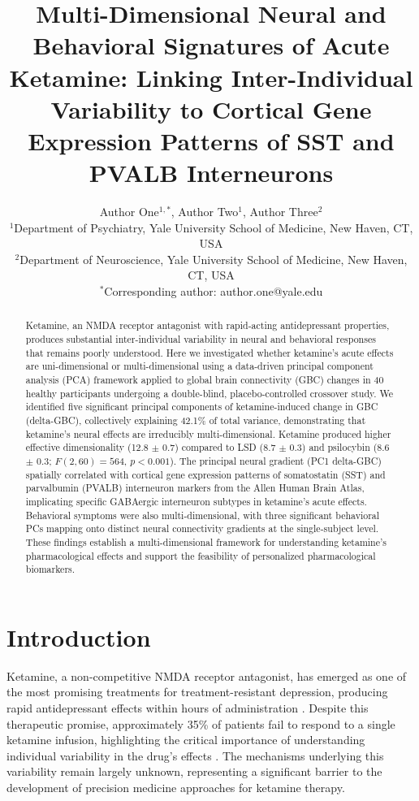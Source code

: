 \documentclass[12pt]{article}
\title{Multi-Dimensional Neural and Behavioral Signatures of Acute Ketamine: Linking Inter-Individual Variability to Cortical Gene Expression Patterns of SST and PVALB Interneurons}
\author{Author One$^{1,*}$, Author Two$^{1}$, Author Three$^{2}$ \\
\small $^1$Department of Psychiatry, Yale University School of Medicine, New Haven, CT, USA \\
\small $^2$Department of Neuroscience, Yale University School of Medicine, New Haven, CT, USA \\
\small $^*$Corresponding author: author.one@yale.edu}
\date{}
\begin{document}
\maketitle

\begin{abstract}
Ketamine, an NMDA receptor antagonist with rapid-acting antidepressant properties, produces substantial inter-individual variability in neural and behavioral responses that remains poorly understood. Here we investigated whether ketamine's acute effects are uni-dimensional or multi-dimensional using a data-driven principal component analysis (PCA) framework applied to global brain connectivity (GBC) changes in 40 healthy participants undergoing a double-blind, placebo-controlled crossover study. We identified five significant principal components of ketamine-induced change in GBC (delta-GBC), collectively explaining 42.1\% of total variance, demonstrating that ketamine's neural effects are irreducibly multi-dimensional. Ketamine produced higher effective dimensionality (12.8 $\pm$ 0.7) compared to LSD (8.7 $\pm$ 0.3) and psilocybin (8.6 $\pm$ 0.3; $F(2,60)=564$, $p<0.001$). The principal neural gradient (PC1 delta-GBC) spatially correlated with cortical gene expression patterns of somatostatin (SST) and parvalbumin (PVALB) interneuron markers from the Allen Human Brain Atlas, implicating specific GABAergic interneuron subtypes in ketamine's acute effects. Behavioral symptoms were also multi-dimensional, with three significant behavioral PCs mapping onto distinct neural connectivity gradients at the single-subject level. These findings establish a multi-dimensional framework for understanding ketamine's pharmacological effects and support the feasibility of personalized pharmacological biomarkers.
\end{abstract}

\section{Introduction}

Ketamine, a non-competitive NMDA receptor antagonist, has emerged as one of the most promising treatments for treatment-resistant depression, producing rapid antidepressant effects within hours of administration \citep{berman2000antidepressant, zarate2006randomized}. Despite this therapeutic promise, approximately 35\% of patients fail to respond to a single ketamine infusion, highlighting the critical importance of understanding individual variability in the drug's effects \citep{abdallah2017ketamine}. The mechanisms underlying this variability remain largely unknown, representing a significant barrier to the development of precision medicine approaches for ketamine therapy.
\end{document}
